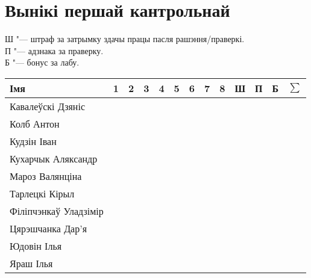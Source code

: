 


	\section{Вынікі першай кантрольнай}
	\noindent Ш "--- штраф за затрымку здачы працы пасля рашэння/праверкі. \\
	П "--- адзнака за праверку. \\
	Б "--- бонус за лабу.
\begin{table}[H]
	\begin{tabular}{|l|c|c|c|c|c|c|c|c|c|c|c|c|}
		\hline
		Імя                 & 1 & 2   & 3   & 4    & 5    & 6 & 7   & 8    & Ш   & П    & Б    & $\sum$ \\ \hline
		Кавалеўскі Дзяніс & & & & & & & & & & & & \\ \hline
		Колб Антон & & & & & & & & & & & & \\ \hline
		Кудзін Іван & & & & & & & & & & & & \\ \hline
		Кухарчык Аляксандр & & & & & & & & & & & & \\ \hline
		Мароз Валянціна & & & & & & & & & & & & \\ \hline
		Тарлецкі Кірыл & & & & & & & & & & & & \\ \hline
		Філіпчэнкаў Уладзімір & & & & & & & & & & & & \\ \hline
		Цярэшчанка Дар'я & & & & & & & & & & & & \\ \hline
		Юдовін Ілья & & & & & & & & & & & & \\ \hline
		Яраш Ілья & & & & & & & & & & & & \\ \hline
	\end{tabular}
\end{table}
	
